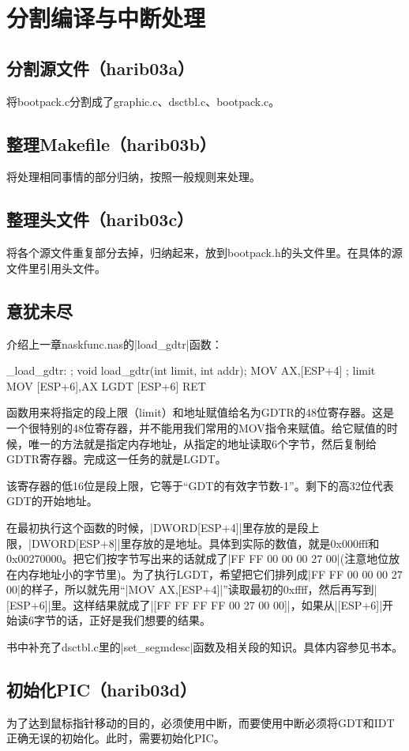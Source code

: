 ﻿\chapter{	分割编译与中断处理	}
\section{	分割源文件（harib03a）	}
将bootpack.c分割成了graphic.c、dsctbl.c、bootpack.c。
\section{	整理Makefile（harib03b）	}
将处理相同事情的部分归纳，按照一般规则来处理。
\section{	整理头文件（harib03c）	}
将各个源文件重复部分去掉，归纳起来，放到bootpack.h的头文件里。在具体的源文件里引用头文件。
\section{	意犹未尽	}
介绍上一章naskfunc.nas的|load_gdtr|函数：
\begin{code}
_load_gdtr:		; void load_gdtr(int limit, int addr);
		MOV		AX,[ESP+4]		; limit
		MOV		[ESP+6],AX
		LGDT	[ESP+6]
		RET
\end{code}

函数用来将指定的段上限（limit）和地址赋值给名为GDTR的48位寄存器。这是一个很特别的48位寄存器，并不能用我们常用的MOV指令来赋值。给它赋值的时候，唯一的方法就是指定内存地址，从指定的地址读取6个字节，然后复制给GDTR寄存器。完成这一任务的就是LGDT。

该寄存器的低16位是段上限，它等于“GDT的有效字节数-1”。剩下的高32位代表GDT的开始地址。

在最初执行这个函数的时候，|DWORD[ESP+4]|里存放的是段上限，|DWORD[ESP+8]|里存放的是地址。具体到实际的数值，就是0x000fff和0x00270000。把它们按字节写出来的话就成了|FF FF 00 00 00 27 00|(注意地位放在内存地址小的字节里)。为了执行LGDT，希望把它们排列成|FF FF 00 00 00 27 00|的样子，所以就先用“|MOV AX,[ESP+4]|”读取最初的0xffff，然后再写到|[ESP+6]|里。这样结果就成了|[FF FF FF FF 00 27 00 00]|，如果从|[ESP+6]|开始读6字节的话，正好是我们想要的结果。

书中补充了dsctbl.c里的|set_segmdesc|函数及相关段的知识。具体内容参见书本。
\section{	初始化PIC（harib03d）	}
为了达到鼠标指针移动的目的，必须使用中断，而要使用中断必须将GDT和IDT正确无误的初始化。此时，需要初始化PIC。


